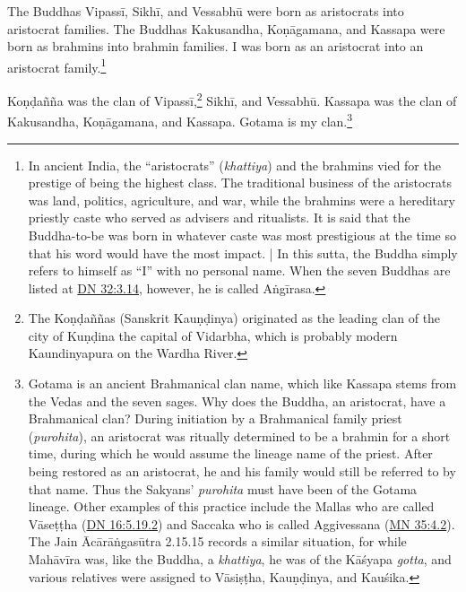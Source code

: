 \documentclass[12pt,openany]{book}%
\begin{document}
The Buddhas \textsanskrit{Vipassī}, \textsanskrit{Sikhī}, and \textsanskrit{Vessabhū} were born as aristocrats into aristocrat families. The Buddhas Kakusandha, \textsanskrit{Koṇāgamana}, and Kassapa were born as brahmins into brahmin families. I was born as an aristocrat into an aristocrat family.\footnote{In ancient India, the “aristocrats” (\textit{khattiya}) and the brahmins vied for the prestige of being the highest class. The traditional business of the aristocrats was land, politics, agriculture, and war, while the brahmins were a hereditary priestly caste who served as advisers and ritualists. It is said that the Buddha-to-be was born in whatever caste was most prestigious at the time so that his word would have the most impact. | In this sutta, the Buddha simply refers to himself as “I” with no personal name. When the seven Buddhas are listed at \href{https://suttacentral.net/dn32/en/sujato\#3.14}{DN 32:3.14}, however, he is called \textsanskrit{Aṅgīrasa}. } 

\textsanskrit{Koṇḍañña} was the clan of \textsanskrit{Vipassī},\footnote{The \textsanskrit{Koṇḍaññas} (Sanskrit \textsanskrit{Kauṇḍinya}) originated as the leading clan of the city of \textsanskrit{Kuṇḍina} the capital of Vidarbha, which is probably modern Kaundinyapura on the Wardha River. } \textsanskrit{Sikhī}, and \textsanskrit{Vessabhū}. Kassapa was the clan of Kakusandha, \textsanskrit{Koṇāgamana}, and Kassapa. Gotama is my clan.\footnote{Gotama is an ancient Brahmanical clan name, which like Kassapa stems from the Vedas and the seven sages. Why does the Buddha, an aristocrat, have a Brahmanical clan? During initiation by a Brahmanical family priest (\textit{purohita}), an aristocrat was ritually determined to be a brahmin for a short time, during which he would assume the lineage name of the priest. After being restored as an aristocrat, he and his family would still be referred to by that name. Thus the Sakyans’ \textit{purohita} must have been of the Gotama lineage. Other examples of this practice include the Mallas who are called \textsanskrit{Vāseṭṭha} (\href{https://suttacentral.net/dn16/en/sujato\#5.19.2}{DN 16:5.19.2}) and Saccaka who is called Aggivessana (\href{https://suttacentral.net/mn35/en/sujato\#4.2}{MN 35:4.2}). The Jain \textsanskrit{Ācārāṅgasūtra} 2.15.15 records a similar situation, for while \textsanskrit{Mahāvīra} was, like the Buddha, a \textit{khattiya}, he was of the \textsanskrit{Kāśyapa} \textit{gotta}, and various relatives were assigned to \textsanskrit{Vāsiṣṭha},  \textsanskrit{Kauṇḍinya}, and  \textsanskrit{Kauśika}. } 
\end{document}
